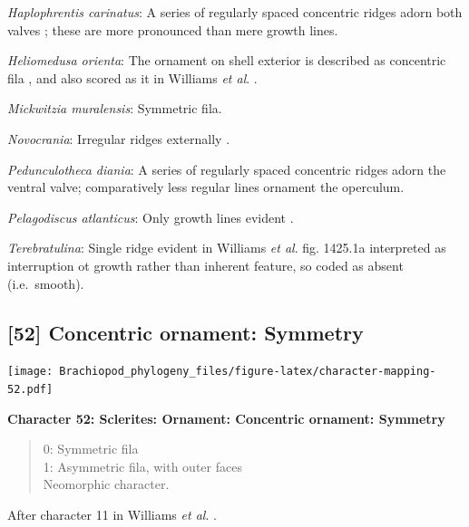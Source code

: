 \documentclass[openany]{book}
\theoremstyle{definition}
\theoremstyle{definition}
\theoremstyle{definition}
\theoremstyle{remark}
\begin{document}
\hypertarget{Haplophrentis_carinatus-coding-51}{}
\emph{Haplophrentis carinatus}: A series of regularly spaced concentric
ridges adorn both valves \citep{Moysiuk2017Hyolithsare}; these are more
pronounced than mere growth lines.

\hypertarget{Heliomedusa_orienta-coding-51}{}
\emph{Heliomedusa orienta}: The ornament on shell exterior is described
as concentric fila \citep[P.43]{Chen2007Reinterpretationof}, and also
scored as it in Williams \emph{et al}.
\citeyearpar[pp.160--163]{Williams2000LinguliformeaCraniiformea}.

\hypertarget{Mickwitzia_muralensis-coding-51}{}
\emph{Mickwitzia muralensis}: Symmetric fila.

\hypertarget{Novocrania-coding-51}{}
\emph{Novocrania}: Irregular ridges externally
\citep{Williams2000LinguliformeaCraniiformea}.

\hypertarget{Pedunculotheca_diania-coding-51}{}
\emph{Pedunculotheca diania}: A series of regularly spaced concentric
ridges adorn the ventral valve; comparatively less regular lines
ornament the operculum.

\hypertarget{Pelagodiscus_atlanticus-coding-51}{}
\emph{Pelagodiscus atlanticus}: Only growth lines evident
\citep{Williams2000LinguliformeaCraniiformea}.

\hypertarget{Terebratulina-coding-51}{}
\emph{Terebratulina}: Single ridge evident in Williams \emph{et al}.
\citeyearpar{Williams2006Rhynchonelliformeapart} fig. 1425.1a
interpreted as interruption ot growth rather than inherent feature, so
coded as absent (i.e.~smooth).

\subsection*{{[}52{]} Concentric ornament:
Symmetry}\label{concentric-ornament-symmetry}

\texttt{[image: Brachiopod\_phylogeny\_files/figure-latex/character-mapping-52.pdf]}

\textbf{Character 52: Sclerites: Ornament: Concentric ornament:
Symmetry}

\begin{quote}
0: Symmetric fila\\
1: Asymmetric fila, with outer faces\\
Neomorphic character.
\end{quote}

After character 11 in Williams \emph{et al}.
\citeyearpar{Williams1998Thediversity}.
\end{document}
